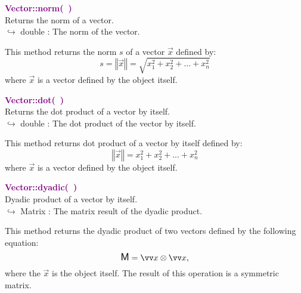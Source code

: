 \textcolor{purple}{\textbf{Vector::norm(~)}}\label{Vector::norm()}\\
Returns the norm of a vector.\\ \hspace*{10mm}$\hookrightarrow$ double : The norm of the vector.

This method returns the norm $s$ of a vector $\overrightarrow{x}$ defined by:
\begin{equation*}
s = \left\Vert \overrightarrow{x} \right\Vert = \sqrt {x_{1}^2 + x_{2}^2 + ... + x_{n}^2}
\end{equation*}
where $\overrightarrow{x}$ is a vector defined by the object itself.

\textcolor{purple}{\textbf{Vector::dot(~)}}\label{Vector::dot()}\\
Returns the dot product of a vector by itself.\\ \hspace*{10mm}$\hookrightarrow$ double : The dot product of the vector by itself.

This method returns dot product of a vector by itself defined by:
\begin{equation*}
 \left\Vert \overrightarrow{x} \right\Vert  = x_{1}^2 + x_{2}^2 + ... + x_{n}^2
\end{equation*}
where $\overrightarrow{x}$ is a vector defined by the object itself.

\textcolor{purple}{\textbf{Vector::dyadic(~)}}\label{Vector::dyadic()}\\
Dyadic product of a vector by itself.\\ \hspace*{10mm}$\hookrightarrow$ Matrix : The matrix result of the dyadic product.

This method returns the dyadic product of two vectors defined by the following equation:
\begin{equation*}
\M = \overrightarrow{x}\otimes\overrightarrow{x},
\end{equation*}
where the $\overrightarrow{x}$ is the object itself.
The result of this operation is a symmetric matrix.

